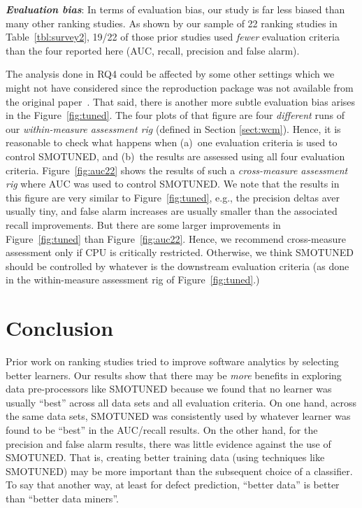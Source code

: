 \documentclass[sigconf]{acmart}
\theoremstyle{break}
\newcommand{\tion}[1]{{Section }\ref{sect:#1}}
\newcommand{\smb}{{\sc SMOTUNED}}
\begin{document}

\textbf{\textit{Evaluation bias}}: In terms of evaluation bias,
our study is far less biased than many other ranking studies.  As shown by our sample of
22 ranking studies in
Table~\ref{tbl:survey2}, 19/22 of those prior studies used {\em fewer} evaluation criteria
than the four reported here (AUC, recall, precision and false alarm). 

The analysis done in RQ4 could be affected by some other settings which we might not have considered since the reproduction package was not available from the original paper~\cite{bennin2017mahakil}.
That said, there is another more subtle evaluation bias arises in the Figure~\ref{fig:tuned}. The four plots of that figure are four {\em different} runs of our  {\em within-measure assessment rig}
(defined in \tion{wcm}). Hence, it is reasonable to check what happens when (a)~one
evaluation criteria is used to control {\smb}, and (b)~the results are assessed
using all four evaluation criteria. 
Figure~\ref{fig:auc22} shows the results of such a {\em cross-measure assessment rig} where AUC was used to control {\smb}. We note that the results in this figure are very similar to Figure~\ref{fig:tuned}, e.g., the precision deltas aver usually tiny, and false alarm increases are usually smaller than the associated recall improvements. But there are some larger improvements in Figure~\ref{fig:tuned}
than Figure~\ref{fig:auc22}. Hence, we recommend cross-measure assessment only if CPU is critically restricted. Otherwise, we think {\smb} should be controlled by whatever is the downstream evaluation criteria
(as done in the within-measure assessment rig of Figure~\ref{fig:tuned}.)



\section{Conclusion}
\label{sect:conclusion}





Prior work on ranking studies tried to improve software analytics by selecting better learners.
Our results show that there may be {\em more} benefits in exploring data pre-processors like {\smb} because we found  that no  learner  was  usually  
``best''  
across all  data  sets  and  all  evaluation  criteria. On one hand, across the same data sets,
{\smb} was  consistently  used  by  whatever  learner  was  found  to  be ``best'' in the  AUC/recall results. On the other hand, for the precision and false alarm results, there was little evidence against the use of {\smb}. That is, creating better training data  (using techniques like {\smb}) may be  more important than  the  subsequent  choice  of a classifier. To say that another way, at least for defect prediction, ``better data'' is  better than ``better
data miners''.
\end{document}
